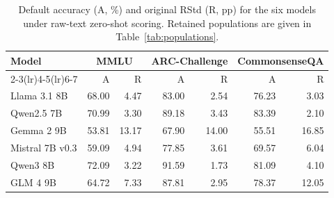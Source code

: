 \begin{table}[htbp]
\centering\small\setlength{\tabcolsep}{4pt}
\caption{Default accuracy (A, \%) and original RStd (R, pp) for the six models under raw-text zero-shot scoring. Retained populations are given in Table~\ref{tab:populations}.}
\label{tab:rq1-default-overview}
\begin{tabular}{lrrrrrr}
\toprule
Model & \multicolumn{2}{c}{MMLU} & \multicolumn{2}{c}{ARC-Challenge} & \multicolumn{2}{c}{CommonsenseQA}\\
\cmidrule(lr){2-3}\cmidrule(lr){4-5}\cmidrule(lr){6-7}
 & A & R & A & R & A & R\\
\midrule
Llama 3.1 8B & 68.00 & 4.47 & 83.00 & 2.54 & 76.23 & 3.03\\
Qwen2.5 7B & 70.99 & 3.30 & 89.18 & 3.43 & 83.39 & 2.10\\
Gemma 2 9B & 53.81 & 13.17 & 67.90 & 14.00 & 55.51 & 16.85\\
Mistral 7B v0.3 & 59.09 & 4.94 & 77.85 & 3.61 & 69.57 & 6.04\\
Qwen3 8B & 72.09 & 3.22 & 91.59 & 1.73 & 81.09 & 4.10\\
GLM 4 9B & 64.72 & 7.33 & 87.81 & 2.95 & 78.37 & 12.05\\
\bottomrule
\end{tabular}
\end{table}
